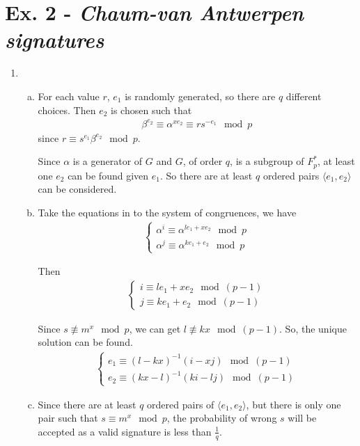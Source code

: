 \documentclass[11pt,a4paper]{article}
\begin{document}
\section*{Ex. 2 - \textit{Chaum-van Antwerpen signatures}}
\begin{enumerate}
\item
	\begin{enumerate}[a)]
	\item For each value $r$, $e_{1}$ is randomly generated, so there are $q$ different choices. Then $e_{2}$ is chosen such that
		\begin{align*}
		\beta^{e_2} \equiv \alpha^{xe_2} \equiv rs^{-e_1} \mod p
		\end{align*}
	since $r \equiv s^{e_{1}} \beta^{e_{2}} \mod p$.
	\par Since $\alpha$ is a generator of $G$ and $G$, of order $q$, is a subgroup of $F_{p}^*$, at least one $e_{2}$ can be found given $e_{1}$. So there are at least $q$ ordered pairs $\langle e_{1}, e_{2} \rangle$ can be considered.
	
	\item Take the equations in to the system of congruences, we have
		\begin{align*}
		\left\lbrace \begin{matrix}
		\alpha^{i} \equiv \alpha^{l e_{1} + x e_{2}} \mod p \\
		\alpha^{j} \equiv \alpha^{k e_{1} + e_{2}} \mod p
		\end{matrix} \right.
		\end{align*}
	\par Then
		\begin{align*}
		\left\lbrace \begin{matrix}
		i \equiv l e_{1} + x e_{2} \mod (p-1) \\
		j \equiv k e_{1} + e_{2} \mod (p-1)
		\end{matrix} \right.		
		\end{align*}
	\par Since $s \not\equiv m^{x} \mod p$, we can get $l \not\equiv kx \mod (p-1)$. So, the unique solution can be found.
		\begin{align*}
		\left\lbrace \begin{matrix}
		e_{1} \equiv (l-kx)^{-1}(i-xj) \mod (p-1) \\
		e_{2} \equiv (kx-l)^{-1}(ki-lj) \mod (p-1)
		\end{matrix} \right.
		\end{align*}
	
	\item Since there are at least $q$ ordered pairs of $\langle e_{1}, e_{2} \rangle$, but there is only one pair such that $s \equiv m^{x} \mod p$, the probability of wrong $s$ will be accepted as a valid signature is less than $\frac{1}{q}$.
	\end{enumerate}


\end{enumerate}
\end{document}
